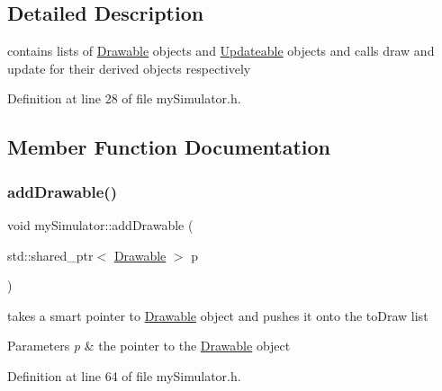 \subsection{Detailed Description}
contains lists of \mbox{\hyperlink{class_drawable}{Drawable}} objects and \mbox{\hyperlink{class_updateable}{Updateable}} objects and calls draw and update for their derived objects respectively 

Definition at line 28 of file my\+Simulator.\+h.



\subsection{Member Function Documentation}
\mbox{\label{classmy_simulator_ab125b77ddb3b0615354f7140f8db56ba}} 
\subsubsection{\texorpdfstring{addDrawable()}{addDrawable()}}
{\footnotesize\ttfamily void my\+Simulator\+::add\+Drawable (\begin{DoxyParamCaption}\item[{std\+::shared\+\_\+ptr$<$ \mbox{\hyperlink{class_drawable}{Drawable}} $>$}]{p }\end{DoxyParamCaption})\hspace{0.3cm}{\ttfamily [inline]}}



takes a smart pointer to \mbox{\hyperlink{class_drawable}{Drawable}} object and pushes it onto the to\+Draw list 


\begin{DoxyParams}{Parameters}
{\em p} & the pointer to the \mbox{\hyperlink{class_drawable}{Drawable}} object \\
\hline
\end{DoxyParams}


Definition at line 64 of file my\+Simulator.\+h.


\begin{DoxyCode}{0}

\end{DoxyCode}
\mbox{\label{classmy_simulator_a92fb2a63bb35e90f9980be016f75b1bf}} 
